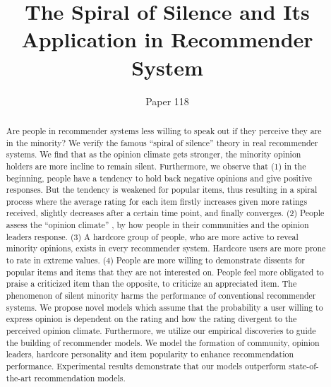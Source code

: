 \documentclass[sigconf]{acmart}
\begin{document}
\title{The Spiral of Silence and Its Application in Recommender System}
\author{Paper 118}

\begin{abstract}
Are people in recommender systems less willing to speak out if they perceive they are in the minority? We verify the famous ``spiral of silence'' theory in real recommender systems. We find that as the opinion climate gets stronger, the minority opinion holders are more incline to remain silent. Furthermore, we observe that (1) in the beginning, people have a tendency to hold back negative opinions and give positive responses. But the tendency is weakened for popular items, thus resulting in a spiral process where the average rating for each item firstly increases given more ratings received, slightly decreases after a certain time point, and finally converges. (2) People assess the ``opinion climate'' , by how people in their communities and the opinion leaders response. (3) A hardcore group of people, who are more active to reveal minority opinions, exists in every recommender system. Hardcore users are more prone to  rate in extreme values. (4) People are more willing to demonstrate dissents for popular items and items that they are not interested on. People feel more obligated to praise a criticized item than the opposite, to criticize an appreciated item.  The phenomenon of silent minority harms the performance of conventional recommender systems. We propose novel models which assume that the probability a user willing to express opinion is dependent on the rating and how the rating divergent to the perceived opinion climate. Furthermore, we utilize our empirical discoveries to guide the building of recommender models. We model the formation of community, opinion leaders, hardcore personality and item popularity to enhance recommendation performance.  Experimental results demonstrate that our models  outperform state-of-the-art recommendation models.
\end{abstract}
\end{document}
